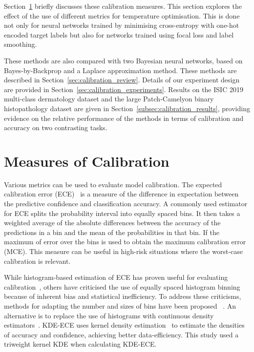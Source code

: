 Section~\ref{sec:calibration_measures} briefly discusses these calibration measures. This section explores the effect of the use of different metrics for temperature optimisation. This is done not only for neural networks trained by minimising cross-entropy with one-hot encoded target labels but also for networks trained using focal loss and label smoothing. 

These methods are also compared with two Bayesian neural networks, based on Bayes-by-Backprop and a Laplace approximation method. These methods are described in Section~\ref{sec:calibration_review}. Details of our experiment design are provided in Section~\ref{sec:calibration_experiments}. Results on the ISIC 2019 multi-class dermatology dataset and the large Patch-Camelyon binary histopathology dataset are given in Section~\ref{subsec:calibration_results}, providing evidence on the relative performance of the methods in terms of calibration and accuracy on two contrasting tasks.



\section{Measures of Calibration}
\label{sec:calibration_measures}
Various metrics can be used to evaluate model calibration. The expected calibration error (ECE)~\citep{guo2017calibration} is a measure of the difference in expectation between the predictive confidence and classification accuracy. A commonly used estimator for ECE splits the probability interval into equally spaced bins. It then takes a weighted average of the absolute differences between the accuracy of the predictions in a bin and the mean of the probabilities in that bin. If the maximum of error over the bins is used to obtain the maximum calibration error (MCE). This measure can be useful in high-risk situations where the worst-case calibration is relevant. 

While histogram-based estimation of ECE has proven useful for evaluating calibration~\citep{muller2019does}, others have criticised the use of equally spaced histogram binning because of inherent bias and statistical inefficiency. To address these criticisms, methods for adapting the number and sizes of bins have been proposed ~\citep{roelofs2022mitigating}. An alternative is to replace the use of histograms with continuous density estimators~\citep{zhang2020mix}. KDE-ECE uses kernel density estimation~\citep{parzen1962estimation} to estimate the densities of accuracy and confidence, achieving better data-efficiency. This study used a triweight kernel KDE when calculating KDE-ECE.

